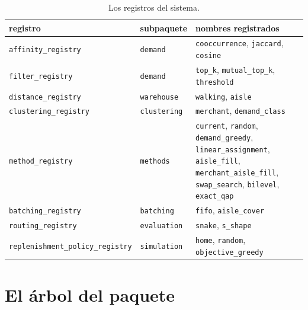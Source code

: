 \documentclass[11pt,a4paper,oneside]{report}
\newcommand{\code}[1]{\texttt{\small #1}}
\begin{document}
\begin{table}[ht]
\centering\small
\begin{tabularx}{\textwidth}{@{}l l L@{}}
\toprule
registro & subpaquete & nombres registrados \\
\midrule
\code{affinity\_registry} & \code{demand} & \code{cooccurrence}, \code{jaccard}, \code{cosine} \\
\code{filter\_registry} & \code{demand} & \code{top\_k}, \code{mutual\_top\_k}, \code{threshold} \\
\code{distance\_registry} & \code{warehouse} & \code{walking}, \code{aisle} \\
\code{clustering\_registry} & \code{clustering} & \code{merchant}, \code{demand\_class} \\
\code{method\_registry} & \code{methods} & \code{current}, \code{random}, \code{demand\_greedy}, \code{linear\_assignment}, \code{aisle\_fill}, \code{merchant\_aisle\_fill}, \code{swap\_search}, \code{bilevel}, \code{exact\_qap} \\
\code{batching\_registry} & \code{batching} & \code{fifo}, \code{aisle\_cover} \\
\code{routing\_registry} & \code{evaluation} & \code{snake}, \code{s\_shape} \\
\code{replenishment\_policy\_registry} & \code{simulation} & \code{home}, \code{random}, \code{objective\_greedy} \\
\bottomrule
\end{tabularx}
\caption{Los registros del sistema.}
\end{table}

\section{El árbol del paquete}
\end{document}
